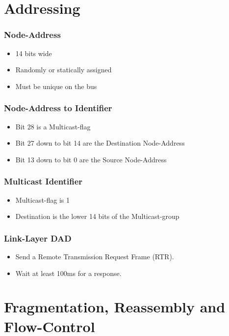 \documentclass[aspectratio=169]{beamer}
\begin{document}
\section{Addressing}

\begin{frame}
	\frametitle{Node-Address}
	\begin{itemize}
		\item 14 bits wide
		\item Randomly or statically assigned
		\item Must be unique on the bus
	\end{itemize}
	
\end{frame}

\begin{frame}
	\frametitle{Node-Address to Identifier}
	\begin{itemize}
		\item Bit 28 is a Multicast-flag
		\item Bit 27 down to bit 14 are the Destination Node-Address
		\item Bit 13 down to bit 0 are the Source Node-Address
	\end{itemize}
	
\end{frame}

\begin{frame}
	\frametitle{Multicast Identifier}
	\begin{itemize}
		\item Multicast-flag is 1
		\item Destination is the lower 14 bits of the Multicast-group
	\end{itemize}
	
\end{frame}

\begin{frame}
	\frametitle{Link-Layer DAD}
	\begin{itemize}
		\item Send a Remote Transmission Request Frame (RTR).
			
		\item Wait at least 100ms for a response.
			
	\end{itemize}	
\end{frame}


\section{Fragmentation, Reassembly and Flow-Control}
\end{document}
